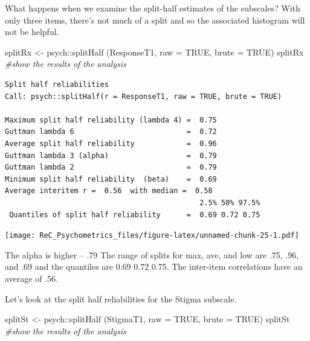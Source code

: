 \documentclass[
  english,
]{book}
\newenvironment{Shaded}{\begin{snugshade}}{\end{snugshade}}
\newcommand{\AttributeTok}[1]{\textcolor[rgb]{0.77,0.63,0.00}{#1}}
\newcommand{\CommentTok}[1]{\textcolor[rgb]{0.56,0.35,0.01}{\textit{#1}}}
\newcommand{\ConstantTok}[1]{\textcolor[rgb]{0.00,0.00,0.00}{#1}}
\newcommand{\DecValTok}[1]{\textcolor[rgb]{0.00,0.00,0.81}{#1}}
\newcommand{\FunctionTok}[1]{\textcolor[rgb]{0.00,0.00,0.00}{#1}}
\newcommand{\NormalTok}[1]{#1}
\newcommand{\OtherTok}[1]{\textcolor[rgb]{0.56,0.35,0.01}{#1}}
\newcommand{\SpecialCharTok}[1]{\textcolor[rgb]{0.00,0.00,0.00}{#1}}
\newcommand{\StringTok}[1]{\textcolor[rgb]{0.31,0.60,0.02}{#1}}
\begin{document}
What happens when we examine the split-half estimates of the subscales? With only three items, there's not much of a split and so the associated histogram will not be helpful.

\begin{Shaded}
\begin{Highlighting}[]
\NormalTok{splitRx }\OtherTok{\textless{}{-}}\NormalTok{ psych}\SpecialCharTok{::}\FunctionTok{splitHalf}\NormalTok{ (ResponseT1, }\AttributeTok{raw =} \ConstantTok{TRUE}\NormalTok{, }\AttributeTok{brute =} \ConstantTok{TRUE}\NormalTok{)}
\NormalTok{splitRx }\CommentTok{\#show the results of the analysis}
\end{Highlighting}
\end{Shaded}

\begin{verbatim}
Split half reliabilities  
Call: psych::splitHalf(r = ResponseT1, raw = TRUE, brute = TRUE)

Maximum split half reliability (lambda 4) =  0.75
Guttman lambda 6                          =  0.72
Average split half reliability            =  0.96
Guttman lambda 3 (alpha)                  =  0.79
Guttman lambda 2                          =  0.79
Minimum split half reliability  (beta)    =  0.69
Average interitem r =  0.56  with median =  0.58
                                             2.5% 50% 97.5%
 Quantiles of split half reliability      =  0.69 0.72 0.75
\end{verbatim}

\begin{Shaded}
\end{Shaded}

\texttt{[image: ReC\_Psychometrics\_files/figure-latex/unnamed-chunk-25-1.pdf]}

The alpha is higher -- .79 The range of splits for max, ave, and low are .75, .96, and .69 and the quantiles are 0.69 0.72 0.75. The inter-item correlations have an average of .56.

Let's look at the split half reliabilities for the Stigma subscale.

\begin{Shaded}
\begin{Highlighting}[]
\NormalTok{splitSt }\OtherTok{\textless{}{-}}\NormalTok{ psych}\SpecialCharTok{::}\FunctionTok{splitHalf}\NormalTok{ (StigmaT1, }\AttributeTok{raw =} \ConstantTok{TRUE}\NormalTok{, }\AttributeTok{brute =} \ConstantTok{TRUE}\NormalTok{)}
\NormalTok{splitSt }\CommentTok{\#show the results of the analysis}
\end{Highlighting}
\end{Shaded}
\end{document}
